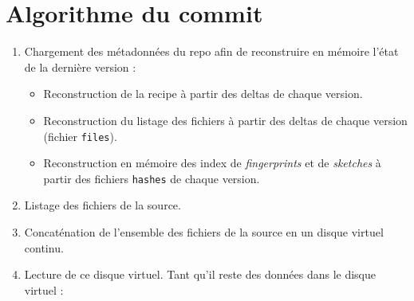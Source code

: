 \documentclass[a4paper]{report}
\begin{document}

\section{Algorithme du commit}

\begin{enumerate}
\item
  Chargement des métadonnées du repo afin de reconstruire en
  mémoire l'état de la dernière version :

  \begin{itemize}
  \item
    Reconstruction de la recipe à partir des deltas de chaque
    version.
  \item
    Reconstruction du listage des fichiers à partir des deltas de chaque
    version (fichier \verb|files|).
  \item
    Reconstruction en mémoire des index de \emph{fingerprints} et
    de \emph{sketches} à partir des fichiers \verb|hashes| de chaque
    version.
  \end{itemize}
\item
  Listage des fichiers de la source.
\item
  Concaténation de l'ensemble des fichiers de la source en un disque
  virtuel continu.
\item
  Lecture de ce disque virtuel. Tant qu'il reste des données dans le disque virtuel :
  

\end{enumerate}
\end{document}
